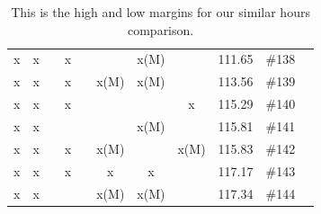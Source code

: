 \begin{table}[H]
{\begin{tabular}{c c c c c c c c c c c}
 x    & x    &      & x    &      &      & x(M) &      & 111.65 & \#138 \\
 x    & x    &      & x    &      & x(M) & x(M) &      & 113.56 & \#139 \\
 x    & x    &      & x    &      &      &      & x    & 115.29 & \#140 \\
 x    & x    &      &      &      &      & x(M) &      & 115.81 & \#141 \\
 x    & x    &      & x    &      & x(M) &      & x(M) & 115.83 & \#142 \\
 x    & x    &      & x    &      & x    & x    &      & 117.17 & \#143 \\
 x    & x    &      &      &      & x(M) & x(M) &      & 117.34 & \#144 \\
	\hline %
	\end{tabular}
}
\caption{This is the high and low margins for our similar hours comparison.} %
\label{table:similarHoursLimits} %
\end{table}

